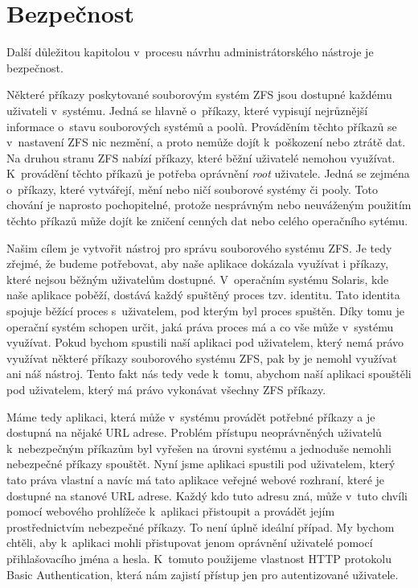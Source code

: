 \section{Bezpečnost}
Další důležitou kapitolou v~procesu návrhu administrátorského nástroje je bezpečnost.

Některé příkazy poskytované souborovým systém ZFS jsou dostupné každému uživateli v~systému. Jedná se hlavně o~příkazy, které vypisují nejrůznější informace o~stavu souborových systémů a poolů. Prováděním těchto příkazů se v~nastavení ZFS nic nezmění, a proto nemůže dojít k~poškození nebo ztrátě dat. Na druhou stranu ZFS nabízí příkazy, které běžní uživatelé nemohou využívat. K~provádění těchto příkazů je potřeba oprávnění \emph{root} uživatele. Jedná se zejména o~příkazy, které vytvářejí, mění nebo ničí souborové systémy či pooly. Toto chování je naprosto pochopitelné, protože nesprávným nebo neuváženým použitím těchto příkazů může dojít ke zničení cenných dat nebo celého operačního sytému.

Našim cílem je vytvořit nástroj pro správu souborového systému ZFS. Je tedy zřejmé, že budeme potřebovat, aby naše aplikace dokázala využívat i příkazy, které nejsou běžným uživatelům dostupné. V~operačním systému Solaris, kde naše aplikace poběží, dostává každý spuštěný proces tzv. identitu. Tato identita spojuje běžící proces s~uživatelem, pod kterým byl proces spuštěn. Díky tomu je operační systém schopen určit, jaká práva proces má a co vše může v~systému využívat. Pokud bychom spustili naší aplikaci pod uživatelem, který nemá právo využívat některé příkazy souborového systému ZFS, pak by je nemohl využívat ani náš nástroj. Tento fakt nás tedy vede k~tomu, abychom naší aplikaci spouštěli pod uživatelem, který má právo vykonávat všechny ZFS příkazy.

Máme tedy aplikaci, která může v~systému provádět potřebné příkazy a je dostupná na nějaké URL adrese. Problém přístupu neoprávněných uživatelů k~nebezpečným příkazům byl vyřešen na úrovni systému a jednoduše nemohli nebezpečné příkazy spouštět. Nyní jsme aplikaci spustili pod uživatelem, který tato práva vlastní a navíc má tato aplikace veřejné webové rozhraní, které je dostupné na stanové URL adrese. Každý kdo tuto adresu zná, může v~tuto chvíli pomocí webového prohlížeče k~aplikaci přistoupit a provádět jejím prostřednictvím nebezpečné příkazy. To není úplně ideální případ. My bychom chtěli, aby k~aplikaci mohli přistupovat jenom oprávnění uživatelé pomocí přihlašovacího jména a hesla. K~tomuto použijeme vlastnost HTTP protokolu Basic Authentication, která nám zajistí přístup jen pro autentizované uživatele.

